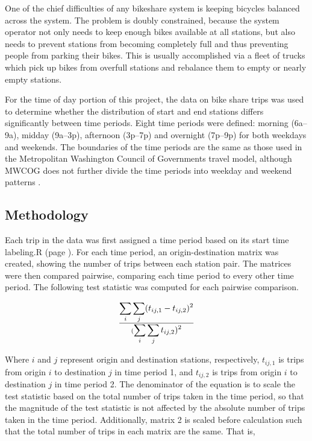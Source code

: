 \documentclass[letterpaper,11pt]{article}
\newcommand{\reflst}[1]{#1 (page \pageref{#1})}
\begin{document}
One of the chief difficulties of any bikeshare system is keeping
bicycles balanced across the system. The problem is doubly
constrained, because the system operator not only needs to keep enough
bikes available at all stations, but also needs to prevent stations
from becoming completely full and thus preventing people from parking
their bikes. This is usually accomplished via a fleet of trucks which
pick up bikes from overfull stations and rebalance them to empty or
nearly empty stations.

For the time of day portion of this project, the data on bike share
trips was used to determine whether the distribution of start and end
stations differs significantly between time periods. Eight time
periods were defined: morning (6a--9a), midday (9a--3p), afternoon
(3p--7p) and overnight (7p--9p) for both weekdays and weekends. The
boundaries of the time periods are the same as those used in the
Metropolitan Washington Council of Governments travel model, although
MWCOG does not further divide the time periods into weekday and
weekend patterns \autocite[14]{MWCOG2013}.

\subsection{Methodology}

Each trip in the data was first assigned a time period based on its
start time \reflst{labeling.R}. For each time period, an origin-destination matrix was
created, showing the number of trips between each station pair. The
matrices were then compared pairwise, comparing each time period to
every other time period. The following test statistic was computed for
each pairwise comparison.

\begin{equation}\label{eq:timets}
 \displaystyle\sum_i \sum_j (t_{ij,1} - t_{ij,2})^2 \over
 (\displaystyle \sum_i \sum_j t_{ij,2})^2
\end{equation}

Where $i$ and $j$ represent origin and destination stations,
respectively, $t_{ij,1}$ is trips from origin $i$ to destination $j$
in time period 1, and $t_{ij,2}$ is trips from origin $i$ to
destination $j$ in time period 2. The denominator of the equation is
to scale the test statistic based on the total number of trips taken
in the time period, so that the magnitude of the test statistic is not
affected by the absolute number of trips taken in the time
period. Additionally, matrix 2 is scaled before calculation such
that the total number of trips in each matrix are the same. That is,
\end{document}
